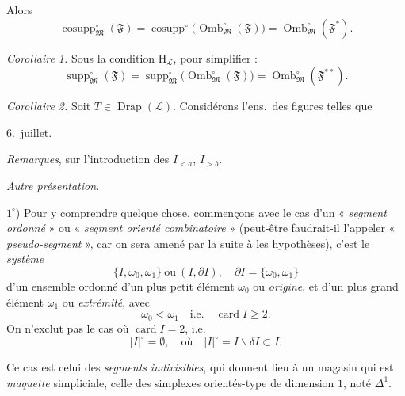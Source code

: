 \documentclass[11pt,a4paper]{article}
\begin{document}
Alors
\[
  \operatorname{cosupp}^{\circ}_{\mathfrak{M}}(\mathfrak{F})
  = \operatorname{cosupp}^{\circ}\bigl(\operatorname{Omb}^{\circ}_{\mathfrak{M}}(\mathfrak{F})\bigr)
  = \operatorname{Omb}^{\circ}_{\mathfrak{M}}(\mathfrak{F}^{*}) .
\]

\emph{Corollaire 1.} Sous la condition $\mathrm{H}_{\mathcal{L}}$, pour simplifier :
\[
  \operatorname{supp}^{\circ}_{\mathfrak{M}}(\mathfrak{F})
  = \operatorname{supp}^{\circ}_{\mathfrak{M}}\bigl(\operatorname{Omb}^{\circ}_{\mathfrak{M}}(\mathfrak{F})\bigr)
  = \operatorname{Omb}^{\circ}_{\mathfrak{M}}(\mathfrak{F}^{**}) .
\]

\emph{Corollaire 2.}  Soit $T \in \operatorname{Drap}(\mathcal{L})$. Considérons l'ens.\ des figures telles que


6.~juillet.

\emph{Remarques}, sur l'introduction des $I_{<a}$, $I_{>b}$.

\emph{Autre présentation.}

$1^{\circ}$) Pour y comprendre quelque chose, commençons avec le cas d'un « \struck{\ill{}} \emph{segment} \emph{ordonné} » ou « \emph{segment orienté combinatoire} » (peut-être faudrait-il l'appeler « \emph{pseudo-segment} », car on sera amené par la suite à  les hypothèses), c'est le \emph{système}
\[
  \{ I, \omega_0, \omega_1 \} \ \text{ou} \ (I, \partial I) , \quad \partial I = \{\omega_0, \omega_1\}
\]
 d'un ensemble ordonné  \struck{\ill{}} d'un plus petit élément $\omega_0$ ou \emph{origine}, et d'un plus grand élément $\omega_1$ ou \emph{extrémité}, avec
\[
  \omega_0 < \omega_1 \quad \text{i.e.} \quad \operatorname{card} I \geq 2 .
\]
On n'exclut pas le cas où $\operatorname{card} I = 2$, i.e.
\[
  |I|^{\circ} = \emptyset , \quad \text{où} \quad |I|^{\circ} = I \smallsetminus \delta I \subset I .
\]

Ce cas est celui des \emph{segments} \emph{indivisibles}, qui donnent lieu à un magasin qui est \struck{\ill{}} \emph{maquette} simpliciale,  celle des simplexes orientés-type de dimension $1$, noté $\Delta^{1}$.
\end{document}
